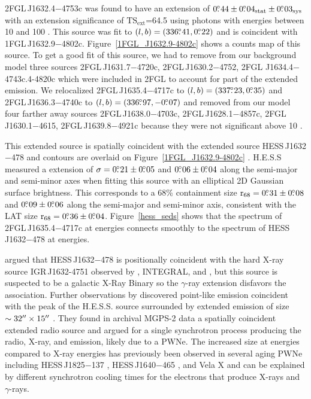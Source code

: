 \documentclass[12pt,preprint]{aastex}
\newcommand{\gev}{\text{GeV}\xspace}
\newcommand{\tev}{\text{TeV}\xspace}
\newcommand{\tsext}{{\ensuremath{\text{TS}_{\text{ext}}}}\xspace}
\newcommand{\asca}{\text{{\em ASCA}}\xspace}
\newcommand{\xmmnewton}{\text{{\em XMM-Newton}}\xspace}
\newcommand{\rsixeight}{{\ensuremath{\text{r}_{68}}}\xspace}
\newcommand{\sys}{\text{sys}\xspace}
\newcommand{\stat}{\text{stat}\xspace}
\begin{document}
2FGL\,J1632.4$-$4753c was found 
to
have an extension of $0\fdg44\pm0\fdg04_\stat\pm0\fdg03_\sys$ 
with an extension
significance of \tsext=64.5
using 
photons with energies between
10 \gev and 100 \gev.  This source was fit to 
$(l,b)=(336\mbox{$.\!\!^\circ$}41,0\mbox{$.\!\!^\circ$}22)$ and is coincident with 
1FGL\,J1632.9$-$4802c.  Figure~\ref{1FGL_J1632.9-4802c}
shows a counts map of this source.
To get a good fit of this source, we had to remove from our background model
three sources 2FGL\,J1631.7$-$4720c, 2FGL\,J1630.2$-$4752,
2FGL J1634.4$-$4743c.4-4820c which were included in 2FGL to account for
part of the extended emission.
We relocalized 2FGL\,J1635.4$-$4717c
to $(l,b)=(337\mbox{$.\!\!^\circ$}23,0\mbox{$.\!\!^\circ$}35)$ and 2FGL\,J1636.3$-$4740c to
$(l,b)=(336\mbox{$.\!\!^\circ$}97,-0\mbox{$.\!\!^\circ$}07)$
and removed from our model four
farther away sources 2FGL\,J1638.0$-$4703c, 
2FGL\,J1628.1$-$4857c, 2FGL\,J1630.1$-$4615, 2FGL\,J1639.8$-$4921c because they
were not significant above 10 \gev.  

This extended source is spatially coincident with the extended
\tev source HESS\,J1632$-$478 
and \tev contours are overlaid on 
Figure~\ref{1FGL_J1632.9-4802c}
\citep{hess_plane_survey}.
H.E.S.S measured a 
extension of $\sigma=0\mbox{$.\!\!^\circ$}21\pm0\mbox{$.\!\!^\circ$}05$ and $0\mbox{$.\!\!^\circ$}06\pm0\mbox{$.\!\!^\circ$}04$ along the
semi-major and semi-minor axes when fitting this source with an
elliptical 2D Gaussian surface brightness.  This corresponds to a 68\%
containment size $\rsixeight=0\fdg31\pm0\fdg08$ and $0\mbox{$.\!\!^\circ$}09\pm0\mbox{$.\!\!^\circ$}06$
along the semi-major and semi-minor axis, consistent with
the LAT size $\rsixeight=0\fdg36\pm0\fdg04$.  Figure~\ref{hess_seds}
shows that the spectrum of 2FGL\,J1635.4$-$4717c at \gev energies
connects smoothly to
the spectrum of HESS\,J1632$-$478 at \tev energies.

\cite{hess_plane_survey} argued that HESS\,J1632$-$478
is positionally coincident with the hard X-ray source
IGR\,J1632-4751 observed by \asca, INTEGRAL, and \xmmnewton
\citep{asca_plane_survey,Igr_J16320-4751_circ,xmm_newton_IGR_J16320-4751},
but this source is suspected to be a galactic X-Ray Binary so the
$\gamma$-ray extension disfavors the association.  Further observations
by \xmmnewton discovered point-like emission coincident with the peak
of the H.E.S.S. source surrounded by extended emission of size
$\sim32\mbox{$^{\prime\prime}$}\times15\mbox{$^{\prime\prime}$}$ \citep{hess_j1632_478_xmm_newton}.
They found in archival MGPS-2 data a spatially coincident extended
radio source \citep{most_survey_galactic_plane} and argued for a single
synchrotron process producing the radio, X-ray, and \tev emission,
likely due to a PWNe.  The increased size at \tev energies compared
to X-ray energies has previously been observed in several aging PWNe
including HESS\,J1825$-$137 \citep{hess_j1825_xmm_newton,hess_j1825_hess},
HESS\,J1640$-$465 \citep{hess_plane_survey,xmm_newton_hess_j_1640-466},
and Vela X \citep{vela_x_rosat,vela_x_hess} and can be explained by
different synchrotron cooling times for the electrons that produce X-rays
and $\gamma$-rays.
\end{document}

